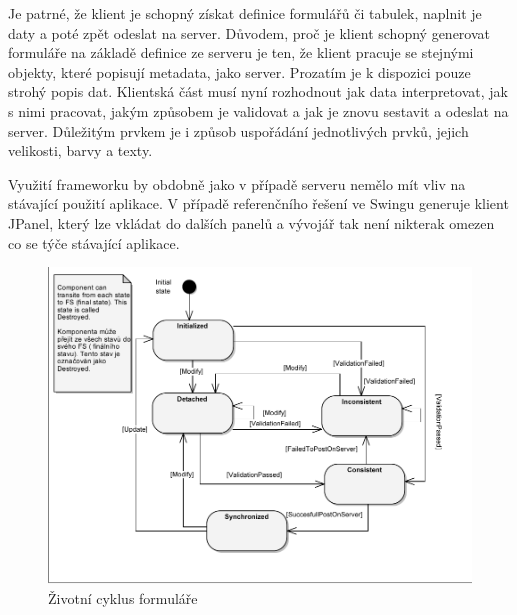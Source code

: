 Je patrné, že klient je schopný získat definice formulářů či tabulek, naplnit je daty a poté zpět odeslat na server. Důvodem, proč je klient schopný generovat formuláře na základě definice ze serveru je ten, že klient pracuje se stejnými objekty, které popisují metadata, jako server. Prozatím je k dispozici pouze strohý popis dat. Klientská část musí nyní rozhodnout jak data interpretovat, jak s nimi pracovat, jakým způsobem je validovat a jak je znovu sestavit a odeslat na server. Důležitým prvkem je i způsob uspořádání jednotlivých prvků, jejich velikosti, barvy a texty.

Využití frameworku by obdobně jako v případě serveru nemělo mít vliv na stávající použití aplikace. V případě referenčního řešení ve Swingu generuje klient JPanel, který lze vkládat do dalších panelů a vývojář tak není nikterak omezen co se týče stávající aplikace. 

\begin{figure}[h!]
\includegraphics{images/formLifecCycle}
\caption{Životní cyklus formuláře}
\label{img:formLifeCycle}
\end{figure}


